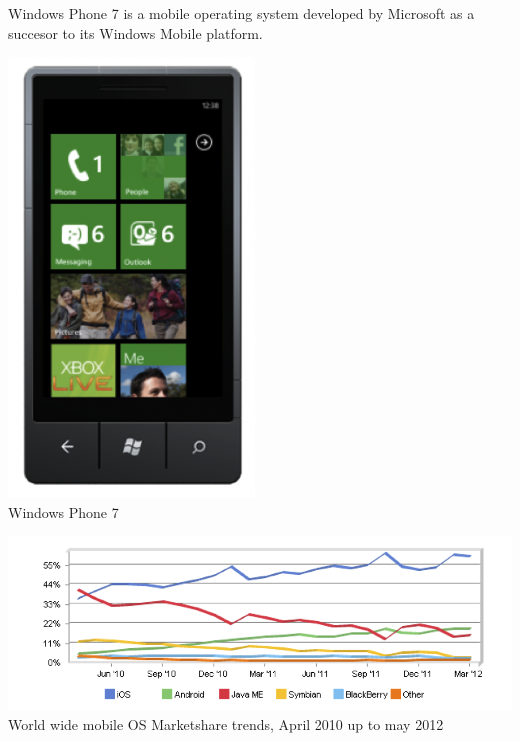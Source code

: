 Windows Phone 7 is a mobile operating system developed by Microsoft as a succesor to its Windows Mobile platform.

\begin{centering}
\includegraphics[scale=0.35]{images/WindowsPhone7.png}\\{Windows Phone 7}\\
\end{centering}





\begin{centering}
\includegraphics[scale=0.5]{images/marketsharetrendsApril10Tomay12.png}\\{World wide mobile OS Marketshare trends, April 2010 up to may 2012}\\
\end{centering}

